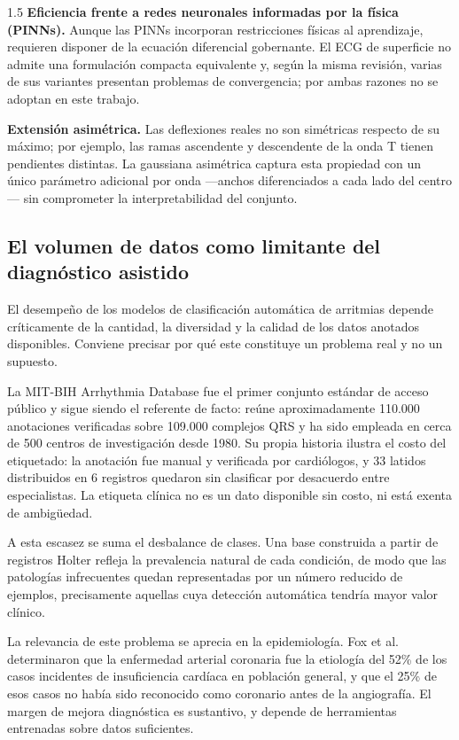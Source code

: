 \begin{spacing}{1.5}
\textbf{Eficiencia frente a redes neuronales informadas por la física (PINNs).} Aunque las PINNs \cite{sophiya2025pinns} incorporan restricciones físicas al aprendizaje, requieren disponer de la ecuación diferencial gobernante. El ECG de superficie no admite una formulación compacta equivalente y, según la misma revisión, varias de sus variantes presentan problemas de convergencia; por ambas razones no se adoptan en este trabajo.

\textbf{Extensión asimétrica.} Las deflexiones reales no son simétricas respecto de su máximo; por ejemplo, las ramas ascendente y descendente de la onda T tienen pendientes distintas. La gaussiana asimétrica captura esta propiedad con un único parámetro adicional por onda ---anchos diferenciados a cada lado del centro--- sin comprometer la interpretabilidad del conjunto.

\subsection{El volumen de datos como limitante del diagnóstico asistido}

El desempeño de los modelos de clasificación automática de arritmias depende críticamente de la cantidad, la diversidad y la calidad de los datos anotados disponibles. Conviene precisar por qué este constituye un problema real y no un supuesto.

La MIT-BIH Arrhythmia Database \cite{moody2001impact} fue el primer conjunto estándar de acceso público y sigue siendo el referente de facto: reúne aproximadamente 110.000 anotaciones verificadas sobre 109.000 complejos QRS y ha sido empleada en cerca de 500 centros de investigación desde 1980. Su propia historia ilustra el costo del etiquetado: la anotación fue manual y verificada por cardiólogos, y 33 latidos distribuidos en 6 registros quedaron sin clasificar por desacuerdo entre especialistas. La etiqueta clínica no es un dato disponible sin costo, ni está exenta de ambigüedad.

A esta escasez se suma el desbalance de clases. Una base construida a partir de registros Holter refleja la prevalencia natural de cada condición, de modo que las patologías infrecuentes quedan representadas por un número reducido de ejemplos, precisamente aquellas cuya detección automática tendría mayor valor clínico.

La relevancia de este problema se aprecia en la epidemiología. Fox et al. \cite{fox2001coronary} determinaron que la enfermedad arterial coronaria fue la etiología del 52\% de los casos incidentes de insuficiencia cardíaca en población general, y que el 25\% de esos casos no había sido reconocido como coronario antes de la angiografía. El margen de mejora diagnóstica es sustantivo, y depende de herramientas entrenadas sobre datos suficientes.


\end{spacing}
